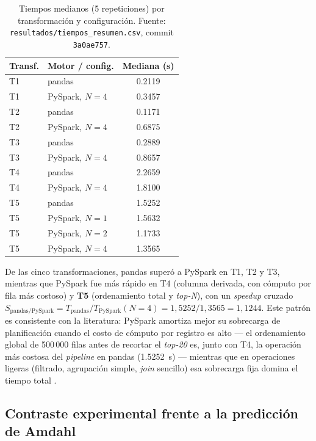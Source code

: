 \documentclass[10pt,conference]{IEEEtran}
\begin{document}
\begin{table}[H]
\centering
\caption{Tiempos medianos (5 repeticiones) por transformación y configuración. Fuente: \texttt{resultados/tiempos\_resumen.csv}, commit \texttt{3a0ae757}.}
\label{tab:datos}
\begin{tabular}{@{}llS[table-format=1.4]@{}}
\toprule
\textbf{Transf.} & \textbf{Motor / config.} & {\textbf{Mediana (s)}} \\
\midrule
T1 & pandas               & 0.2119 \\
T1 & PySpark, $N{=}4$     & 0.3457 \\
T2 & pandas               & 0.1171 \\
T2 & PySpark, $N{=}4$     & 0.6875 \\
T3 & pandas               & 0.2889 \\
T3 & PySpark, $N{=}4$     & 0.8657 \\
T4 & pandas               & 2.2659 \\
T4 & PySpark, $N{=}4$     & 1.8100 \\
T5 & pandas               & 1.5252 \\
T5 & PySpark, $N{=}1$     & 1.5632 \\
T5 & PySpark, $N{=}2$     & 1.1733 \\
T5 & PySpark, $N{=}4$     & 1.3565 \\
\bottomrule
\end{tabular}
\end{table}

De las cinco transformaciones, pandas superó a PySpark en T1, T2 y T3, mientras que PySpark fue más rápido en T4 (columna derivada, con cómputo por fila más costoso) y \textbf{T5} (ordenamiento total y \textit{top-N}), con un \textit{speedup} cruzado $S_{\text{pandas/PySpark}} = T_{\text{pandas}}/T_{\text{PySpark}}(N{=}4) = 1{,}5252/1{,}3565 = 1{,}1244$. Este patrón es consistente con la literatura: PySpark amortiza mejor su sobrecarga de planificación cuando el costo de cómputo por registro es alto --- el ordenamiento global de 500\,000 filas antes de recortar el \textit{top-20} es, junto con T4, la operación más costosa del \textit{pipeline} en pandas (\SI{1.5252}{\second}) --- mientras que en operaciones ligeras (filtrado, agrupación simple, \textit{join} sencillo) esa sobrecarga fija domina el tiempo total \cite{zaharia2016spark}.

\subsection{Contraste experimental frente a la predicción de Amdahl}
\end{document}
